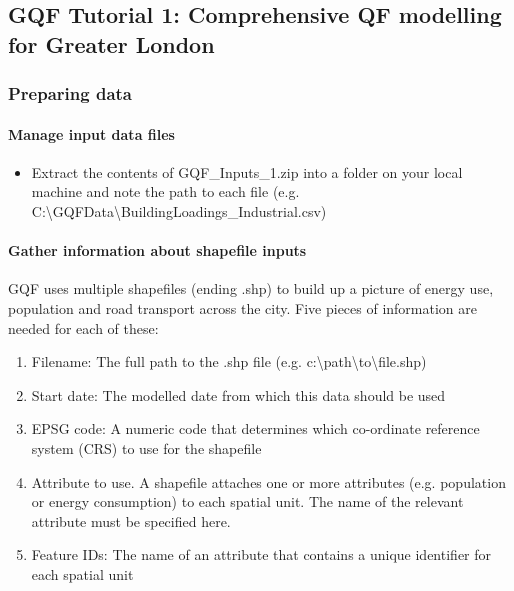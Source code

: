 \documentclass[letterpaper,10pt,english]{sphinxmanual}
\begin{document}
\subsection{GQF Tutorial 1: Comprehensive QF modelling for Greater London}
\label{\detokenize{Tutorials/GQF:gqf-tutorial-1-comprehensive-qf-modelling-for-greater-london}}

\subsubsection{Preparing data}
\label{\detokenize{Tutorials/GQF:preparing-data}}

\paragraph{Manage input data files}
\label{\detokenize{Tutorials/GQF:manage-input-data-files}}\begin{itemize}
\item {} 
Extract the contents of GQF\_Inputs\_1.zip into a folder on your
local machine and note the path to each file (e.g.
C:\textbackslash{}GQFData\textbackslash{}BuildingLoadings\_Industrial.csv)

\end{itemize}


\paragraph{Gather information about shapefile inputs}
\label{\detokenize{Tutorials/GQF:gather-information-about-shapefile-inputs}}
GQF uses multiple shapefiles (ending .shp) to build up a picture of
energy use, population and road transport across the city. Five pieces
of information are needed for each of these:
\begin{enumerate}
\item {} 
Filename: The full path to the .shp file (e.g.
c:\textbackslash{}path\textbackslash{}to\textbackslash{}file.shp)

\item {} 
Start date: The modelled date from which this data should be used

\item {} 
EPSG code: A numeric code that determines which co-ordinate reference
system (CRS) to use for the shapefile

\item {} 
Attribute to use. A shapefile attaches one or more attributes (e.g.
population or energy consumption) to each spatial unit. The name of
the relevant attribute must be specified here.

\item {} 
Feature IDs: The name of an attribute that contains a unique
identifier for each spatial unit

\end{enumerate}
\end{document}

